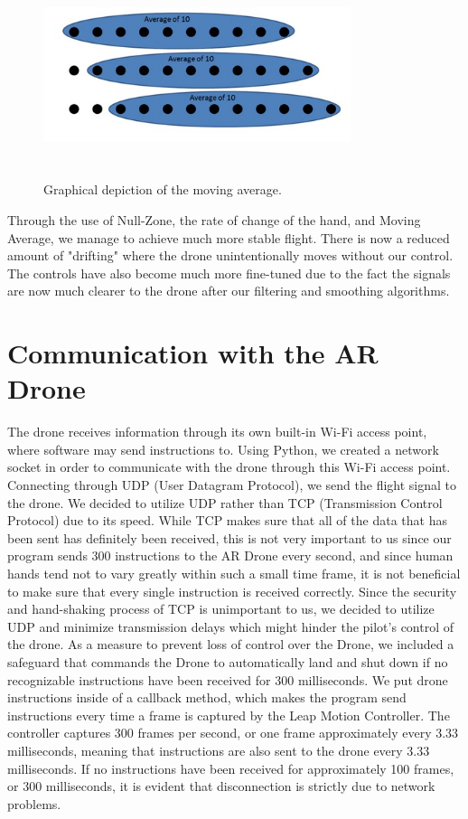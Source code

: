 \documentclass[letterpaper,english, 12pt]{article}
\begin{document}
\begin{figure}[H]
	\centering
	\includegraphics[height=6cm,width=90mm]{pics/movingAverage.jpg}
	\caption{Graphical depiction of the moving average.}
\end{figure}

Through the use of Null-Zone, the rate of change of the hand, and Moving Average, we manage to achieve much more stable flight.  There is now a reduced amount of "drifting" where the drone unintentionally moves without our control.  The controls have also become much more fine-tuned due to the fact the signals are now much clearer to the drone after our filtering and smoothing algorithms.  

\section*{Communication with the AR Drone}

The drone receives information through its own built-in Wi-Fi access point, where software may send instructions to. Using Python, we created a network socket in order to communicate with the drone through this Wi-Fi access point. Connecting through UDP (User Datagram Protocol), we send the flight signal to the drone. We decided to utilize UDP rather than TCP (Transmission Control Protocol) due to its speed. While TCP makes sure that all of the data that has been sent has definitely been received, this is not very important to us since our program sends 300 instructions to the AR Drone every second, and since human hands tend not to vary greatly within such a small time frame, it is not beneficial to make sure that every single instruction is received correctly. Since the security and hand-shaking process of TCP is unimportant to us, we decided to utilize UDP and minimize transmission delays which might hinder the pilot's control of the drone. As a measure to prevent loss of control over the Drone, we included a safeguard that commands the Drone to automatically land and shut down if no recognizable instructions have been received for 300 milliseconds. We put drone instructions inside of a callback method, which makes the program send instructions every time a frame is captured by the Leap Motion Controller. The controller captures 300 frames per second, or one frame approximately every 3.33 milliseconds, meaning that instructions are also sent to the drone every 3.33 milliseconds. If no instructions have been received for approximately 100 frames, or 300 milliseconds, it is evident that disconnection is strictly due to network problems.
\end{document}
